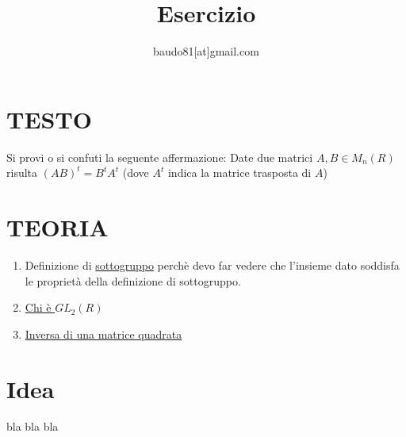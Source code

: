 \documentclass[a4paper,10pt]{article}
\title{Esercizio}
\author{baudo81[at]gmail.com}
\begin{document}
\maketitle

\section*{TESTO}
Si provi o si confuti la seguente affermazione: Date due matrici $A, B \in M_n(R)$ risulta $(AB)^t = B^tA^t$ (dove $A^t$ indica la matrice trasposta di $A$)

\section*{TEORIA}

\begin{enumerate}
 \item Definizione di \href{./sottogruppo.html}{sottogruppo} perchè devo far vedere che l'insieme dato soddisfa le proprietà della definizione di sottogruppo.
 \item \href{./GL.html}{Chi è $GL_{2}(R)$}
 \item \href{./MatriceInvertibile.html}{Inversa di una matrice quadrata}
\end{enumerate}

\section*{Idea}
bla bla bla
\end{document}
